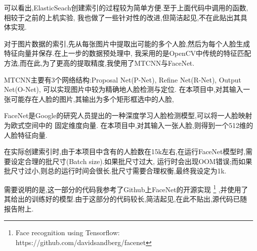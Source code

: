 \documentclass[a4paper]{article}
\begin{document}
可以看出,ElasticSeach创建索引的过程较为简单方便.至于上面代码中调用的函数,相较于之前的上机实验,
我也做了一些针对性的改进,但简洁起见,不在此贴出其具体实现.

对于图片数据的索引,先从每张图片中提取出可能的多个人脸,然后为每个人脸生成特征向量并保存.在上一步的数据预处理中,
我采用的是OpenCV中传统的特征匹配方法,而在此,为了更高的提取精度,我使用了MTCNN\cite{zhang2016joint}与FaceNet\cite{schroff2015facenet}.

MTCNN\cite{zhang2016joint}主要有3个网络结构:Proposal Net(P-Net), Refine Net(R-Net), Output Net(O-Net),
可以实现图片中较为精确地人脸检测与定位. 在本项目中,对其输入一张可能存在人脸的图片,其输出为多个矩形框选中的人脸,

FaceNet\cite{schroff2015facenet}是Google的研究人员提出的一种深度学习人脸检测模型,可以将一人脸映射为欧式空间中的
固定维度向量. 在本项目中,对其输入一张人脸,则得到一个512维的人脸特征向量.

在实际创建索引时,由于本项目中含有的人脸数在15k左右,在运行FaceNet模型时,需要设定合理的批尺寸(Batch size).如果批尺寸过大,
运行时会出现OOM错误;而如果批尺寸过小,则总的运行时间会很长.批尺寸需要合理权衡,最终我设定为1k.

需要说明的是,这一部分的代码我参考了Github上FaceNet的开源实现
\footnote{Face recognition using Tensorflow: https://github.com/davidsandberg/facenet}
,并使用了其给出的训练好的模型.由于这部分的代码较长,简洁起见,在此不贴出,源代码已随报告附上.
\end{document}
